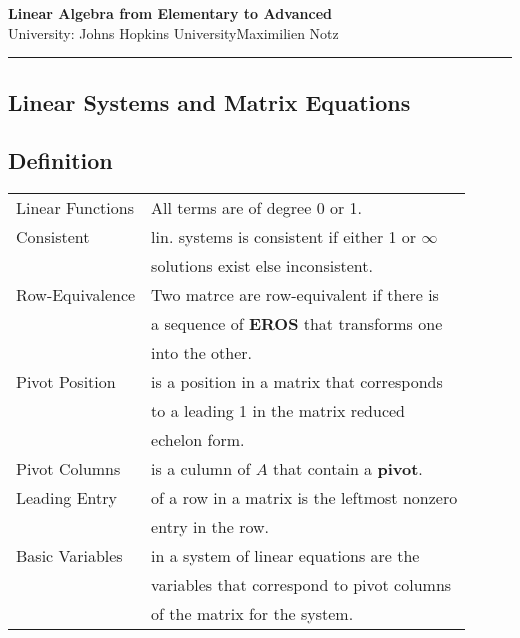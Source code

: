 \documentclass[5pt]{article}
\begin{document}
\begin{center}
     \Large{\textbf{Linear Algebra from Elementary to Advanced}}\\
     \footnotesize{University: Johns Hopkins University}\hfill\footnotesize{\textcopyright Maximilien Notz \the\year{}}
     \noindent\rule{20.2cm}{0.4pt}
\end{center}


\begin{multicols}{2}
\setcounter{secnumdepth}{0}

\section{Linear Systems and Matrix Equations}
\subsection{Definition}
\begin{tabular}{ll}
    Linear Functions        & All terms are of  degree 0 or 1. \\
    Consistent              & lin. systems is consistent if either 1 or $\infty$ \\
                            & solutions exist else inconsistent.\\
\small{Row-Equivalence}     & Two matrce are row-equivalent if there is\\
                            & a sequence of \textbf{EROS} that transforms one\\
                            & into the other.\\
    Pivot Position          & is a position in a matrix that corresponds\\
                            & to a leading 1 in the matrix reduced\\
                            & echelon form.\\
    Pivot Columns           & is a culumn of $A$ that contain a \textbf{pivot}.\\
    Leading Entry           & of a row in a matrix is the leftmost nonzero\\
                            & entry in the row.\\
    Basic Variables         & in a system of linear equations are the\\
                            & variables that correspond to pivot columns\\
                            & of the matrix for the system.\\                    

\end{tabular}
\end{multicols}
\end{document}
